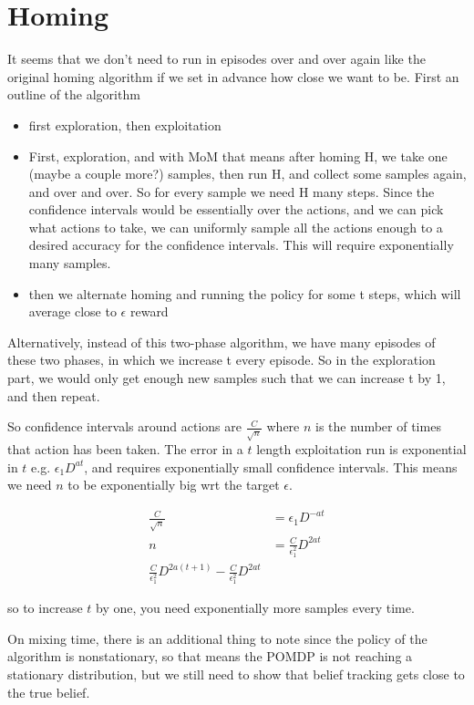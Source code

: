 \documentclass[10pt,english]{article}
\begin{document}
\section{Homing}

It seems that we don't need to run in episodes over and over again like the original homing algorithm if we set in advance how close we want to be. First an outline of the algorithm
\begin{itemize}
\item first exploration, then exploitation
\item First, exploration, and with MoM that means after homing H, we take one (maybe a couple more?) samples, then run H, and collect some samples again, and over and over. So for every sample we need H many steps. Since the confidence intervals would be essentially over the actions, and we can pick what actions to take, we can uniformly sample all the actions enough to a desired accuracy for the confidence intervals. This will require exponentially many samples.
\item then we alternate homing and running the policy for some t steps, which will average close to $\epsilon$ reward
\end{itemize}

Alternatively, instead of this two-phase algorithm, we have many episodes of these two phases, in which we increase t every episode. So in the exploration part, we would only get enough new samples such that we can increase t by 1, and then repeat.

So confidence intervals around actions are $\frac{C}{\sqrt{n}}$ where $n$ is the number of times that action has been taken. The error in a $t$ length exploitation run is exponential in $t$ e.g. $\epsilon_1 D^{at}$, and requires exponentially small confidence intervals. This means we need $n$ to be exponentially big wrt the target $\epsilon$.

\begin{align}
\frac{C}{\sqrt{n}} &= \epsilon_1 D^{-at} \\
n &= \frac{C}{\epsilon_1^2} D^{2at} \\
\frac{C}{\epsilon_1^2} D^{2a(t+1)} - \frac{C}{\epsilon_1^2} D^{2at}
\end{align}

so to increase $t$ by one, you need exponentially more samples every time.

On mixing time, there is an additional thing to note since the policy of the algorithm is nonstationary, so that means the POMDP is not reaching a stationary distribution, but we still need to show that belief tracking gets close to the true belief.
\end{document}
